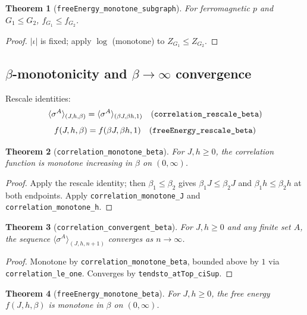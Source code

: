 \documentclass[a4paper,11pt]{article}
\newtheorem{theorem}{Theorem}
\begin{document}
\begin{theorem}[\texttt{freeEnergy\_monotone\_subgraph}]
For ferromagnetic $p$ and $G_1\le G_2$, $f_{G_1}\le f_{G_2}$.
\end{theorem}

\begin{proof}
$|\iota|$ is fixed; apply $\log$ (monotone) to $Z_{G_1}\le Z_{G_2}$.
\end{proof}

\subsection{\texorpdfstring{$\beta$-monotonicity and $\beta \to \infty$ convergence}{beta-monotonicity and beta to infinity convergence}}

Rescale identities:
\[
  \langle\sigma^A\rangle_{(J,h,\beta)} = \langle\sigma^A\rangle_{(\beta J, \beta h, 1)}
  \quad\text{(\texttt{correlation\_rescale\_beta})}
\]
\[
  f(J,h,\beta) = f(\beta J, \beta h, 1)
  \quad\text{(\texttt{freeEnergy\_rescale\_beta})}
\]

\begin{theorem}[\texttt{correlation\_monotone\_beta}]
For $J, h \ge 0$, the correlation function is monotone increasing in
$\beta$ on $(0, \infty)$.
\end{theorem}

\begin{proof}
Apply the rescale identity; then $\beta_1 \le \beta_2$ gives
$\beta_1 J \le \beta_2 J$ and $\beta_1 h \le \beta_2 h$ at both
endpoints.  Apply \texttt{correlation\_monotone\_J} and
\texttt{correlation\_monotone\_h}.
\end{proof}

\begin{theorem}[\texttt{correlation\_convergent\_beta}]
For $J, h \ge 0$ and any finite set $A$, the sequence
$\langle\sigma^A\rangle_{(J,h,n+1)}$ converges as $n \to \infty$.
\end{theorem}

\begin{proof}
Monotone by \texttt{correlation\_monotone\_beta}, bounded above by
$1$ via \texttt{correlation\_le\_one}. Converges by
\texttt{tendsto\_atTop\_ciSup}.
\end{proof}

\begin{theorem}[\texttt{freeEnergy\_monotone\_beta}]
For $J, h \ge 0$, the free energy $f(J,h,\beta)$ is monotone in $\beta$
on $(0,\infty)$.
\end{theorem}
\end{document}
